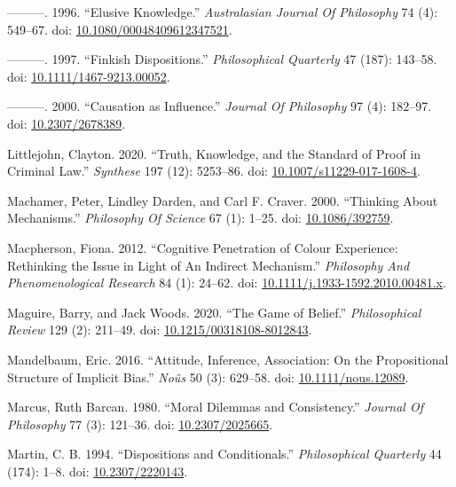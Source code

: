 \documentclass[
  10pt,
  letterpaper,
  DIV=11,
  numbers=noendperiod,
  twoside]{scrartcl}
\newlength{\cslhangindent}
\newenvironment{CSLReferences}[2] %
 {\begin{list}{}{%
  \setlength{\itemindent}{0pt}
  \setlength{\leftmargin}{0pt}
  \setlength{\parsep}{0pt}
  \ifodd #1
   \setlength{\leftmargin}{\cslhangindent}
   \setlength{\itemindent}{-1\cslhangindent}
  \fi
  \setlength{\itemsep}{#2\baselineskip}}}
 {\end{list}}
\begin{document}
\begin{CSLReferences}{1}{0}
---------. 1996. {``Elusive Knowledge.''} \emph{Australasian Journal Of
Philosophy} 74 (4): 549--67. doi:
\href{https://doi.org/10.1080/00048409612347521}{10.1080/00048409612347521}.

---------. 1997. {``Finkish Dispositions.''} \emph{Philosophical
Quarterly} 47 (187): 143--58. doi:
\href{https://doi.org/10.1111/1467-9213.00052}{10.1111/1467-9213.00052}.

---------. 2000. {``Causation as Influence.''} \emph{Journal Of
Philosophy} 97 (4): 182--97. doi:
\href{https://doi.org/10.2307/2678389}{10.2307/2678389}.

Littlejohn, Clayton. 2020. {``Truth, Knowledge, and the Standard of
Proof in Criminal Law.''} \emph{Synthese} 197 (12): 5253--86. doi:
\href{https://doi.org/10.1007/s11229-017-1608-4}{10.1007/s11229-017-1608-4}.

Machamer, Peter, Lindley Darden, and Carl F. Craver. 2000. {``Thinking
About Mechanisms.''} \emph{Philosophy Of Science} 67 (1): 1--25. doi:
\href{https://doi.org/10.1086/392759}{10.1086/392759}.

Macpherson, Fiona. 2012. {``Cognitive Penetration of Colour Experience:
Rethinking the Issue in Light of An Indirect Mechanism.''}
\emph{Philosophy And Phenomenological Research} 84 (1): 24--62. doi:
\href{https://doi.org/10.1111/j.1933-1592.2010.00481.x}{10.1111/j.1933-1592.2010.00481.x}.

Maguire, Barry, and Jack Woods. 2020. {``The Game of Belief.''}
\emph{Philosophical Review} 129 (2): 211--49. doi:
\href{https://doi.org/10.1215/00318108-8012843}{10.1215/00318108-8012843}.

Mandelbaum, Eric. 2016. {``Attitude, Inference, Association: On the
Propositional Structure of Implicit Bias.''} \emph{Noûs} 50 (3):
629--58. doi:
\href{https://doi.org/10.1111/nous.12089}{10.1111/nous.12089}.

Marcus, Ruth Barcan. 1980. {``Moral Dilemmas and Consistency.''}
\emph{Journal Of Philosophy} 77 (3): 121--36. doi:
\href{https://doi.org/10.2307/2025665}{10.2307/2025665}.

Martin, C. B. 1994. {``Dispositions and Conditionals.''}
\emph{Philosophical Quarterly} 44 (174): 1--8. doi:
\href{https://doi.org/10.2307/2220143}{10.2307/2220143}.


\end{CSLReferences}
\end{document}
